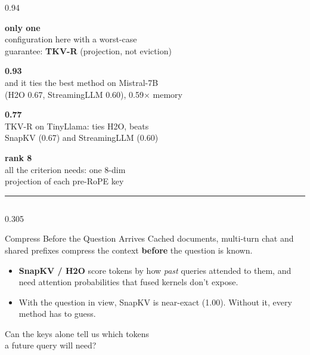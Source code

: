 \documentclass[final]{beamer}
\newcommand{\takeaway}[1]{%
  \begin{center}
  \colorbox{soft}{\parbox{0.96\linewidth}{\vspace{0.35cm}\centering\large #1\vspace{0.35cm}}}
  \end{center}}
\newcommand{\stat}[3]{%
  \begin{minipage}[t]{0.235\linewidth}\centering
    {\fontsize{76}{76}\selectfont\bfseries\color{#1}#2}\\[0.4cm]
    {\large #3}
  \end{minipage}}
\begin{document}
\begin{frame}[t]
\vspace{0.5cm}

\begin{columns}[t]
\begin{column}{0.94\paperwidth}
\stat{good}{only one}{configuration here with a worst-case\\ guarantee: \textbf{TKV-R} (projection, not eviction)}\hfill
\stat{accent}{0.93}{and it ties the best method on Mistral-7B\\ (H2O 0.67, StreamingLLM 0.60), 0.59$\times$ memory}\hfill
\stat{accent}{0.77}{TKV-R on TinyLlama: ties H2O, beats\\ SnapKV (0.67) and StreamingLLM (0.60)}\hfill
\stat{teal}{rank 8}{all the criterion needs: one 8-dim\\ projection of each pre-RoPE key}
\par\vspace{0.4cm}
{\color{muted!40}\rule{\linewidth}{2pt}}
\end{column}
\end{columns}

\vspace{0.4cm}

\begin{columns}[t]
\begin{column}{0.305\paperwidth}

\begin{block}{Compress Before the Question Arrives}
Cached documents, multi-turn chat and shared prefixes compress the context
\textbf{before} the question is known.
\vspace{0.2cm}
\begin{itemize}
  \item \textbf{SnapKV / H2O} score tokens by how \emph{past} queries attended to them, and need attention probabilities that fused kernels don't expose.
  \item With the question in view, SnapKV is near-exact (1.00). Without it, every method has to guess.
\end{itemize}
\takeaway{Can the keys alone tell us which tokens\\ a future query will need?}
\end{block}


\end{column}
\end{columns}
\end{frame}
\end{document}
